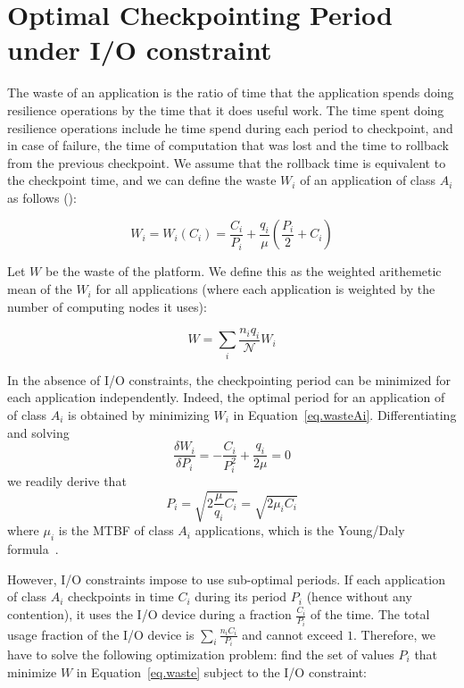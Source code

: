 \documentclass{article}
\newcommand{\nbnodesplat}{{\mathcal N}}
\newcommand{\app}[1]{A_{#1}}
\newcommand{\nbapp}[1]{n_{#1}}
\newcommand{\nbnodes}[1]{q_{#1}}
\newcommand{\period}[1]{P_{#1}}
\newcommand{\ckpt}[1]{C_{#1}}
\newcommand{\wasteapp}[1]{W_{#1}}
\newcommand{\mtbfplat}{\mu}
\newcommand{\wasteplat}{W}
\newcommand{\wastefct}[2]{W_{#1}(#2)}
\begin{document}
\section{Optimal Checkpointing Period under I/O constraint}
\label{sec.optimal}

The waste of an application is the ratio of time that the application spends doing
resilience operations by the time that it does useful work. The time
spent doing resilience operations include he time spend during each period to
checkpoint, and in case of failure, the time of computation that was
lost and the time to rollback from the previous checkpoint. We assume
that the rollback time is equivalent to the checkpoint time, and we
can define the waste $\wasteapp{i}$ of an application of class
$\app{i}$ as follows (\cite{springer-monograph}):

\begin{equation}
\wasteapp{i} = \wastefct{i}{\ckpt{i}} = \frac{\ckpt{i}}{\period{i}} +
\frac{\nbnodes{i}}{\mtbfplat}(\frac{\period{i}}{2} + \ckpt{i})
\label{eq.wasteAi}
\end{equation}

Let $\wasteplat$ be the waste of the platform. We define this as the
weighted arithemetic mean of the $\wasteapp{i}$ for all applications
(where each application is weighted by the number of computing nodes
it uses):

\begin{equation}
\wasteplat = \sum_i \frac{\nbapp{i} \nbnodes{i}}{\nbnodesplat} \wasteapp{i}
\label{eq.waste}
\end{equation}

In the absence of I/O constraints, the checkpointing period can be minimized
for each application independently. Indeed, the optimal period for an application of 
of class $\app{i}$ is obtained by minimizing $\wasteapp{i}$ in Equation~\eqref{eq.wasteAi}.
Differentiating and solving 
$$\frac{\delta \wasteapp{i}}{\delta \period{i}} = - \frac{\ckpt{i}}{\period{i}^{2}} + \frac{\nbnodes{i}}{2 \mtbfplat} = 0$$
we readily derive that
$$\period{i} = \sqrt{2 \frac{\mtbfplat}{\nbnodes{i}} \ckpt{i}} = \sqrt{2 \mu_{i} \ckpt{i}}$$
where $\mu_{i}$ is the MTBF of  class $\app{i}$ applications, which is the Young/Daly formula~\cite{young74,daly04}.

However, I/O constraints impose to use sub-optimal periods. If each application
of  class $\app{i}$ checkpoints in time $\ckpt{i}$ during its period $\period{i}$ (hence without any contention), it uses the I/O device during a fraction $\frac{\ckpt{i}}{\period{i}}$ of the time.
The total usage fraction of the  I/O device is $\sum_{i} \frac{\nbapp{i} \ckpt{i}}{\period{i}}$
and cannot exceed $1$. Therefore, we have to solve the following optimization problem: find
the set of values $\period{i}$ that minimize $\wasteplat$ in Equation~\eqref{eq.waste} subject to the I/O constraint:
\end{document}
